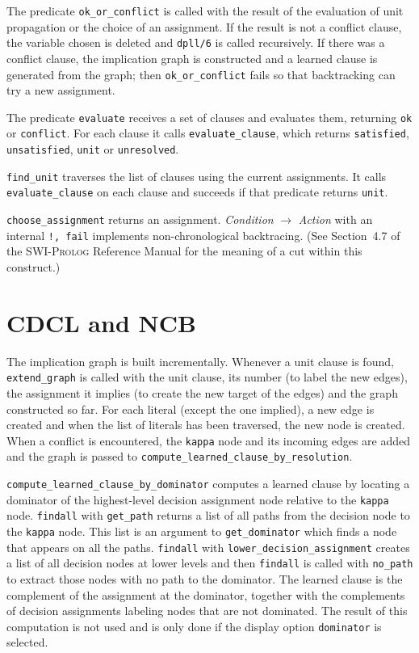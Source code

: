 \documentclass[11pt]{report}
\newcommand*{\p}[1]{\textup{\texttt{#1}}}
\newcommand*{\sw}{\textsc{SWI-Prolog}}
\begin{document}
The predicate \p{ok\_or\_conflict} is called with the result of the
evaluation of unit propagation or the choice of an assignment. If the
result is not a conflict clause, the variable chosen is deleted and
\p{dpll/6} is called recursively. If there was a conflict clause, the
implication graph is constructed and a learned clause is generated from
the graph; then \p{ok\_or\_conflict} fails so that backtracking can try
a new assignment.

The predicate \p{evaluate} receives a set of clauses and evaluates them,
returning \p{ok} or \p{conflict}. For each clause it calls
\p{evaluate\_clause}, which returns \p{satisfied}, \p{unsatisfied},
\p{unit} or \p{unresolved}.

\p{find\_unit} traverses the list of clauses using the current
assignments. It calls \p{evaluate\_clause} on each clause and succeeds
if that predicate returns \p{unit}.

\p{choose\_assignment} returns an assignment. \emph{Condition}
$\rightarrow$ \emph{Action} with an internal \p{!, fail} implements
non-chronological backtracing. (See Section~4.7 of the \sw{} Reference
Manual for the meaning of a cut within this construct.)


\section{CDCL and NCB}

The implication graph is built incrementally. Whenever a unit clause is
found, \p{extend\_graph} is called with the unit clause, its number (to
label the new edges), the assignment it implies (to create the new
target of the edges) and the graph constructed so far. For each literal
(except the one implied), a new edge is created and when the list of
literals has been traversed, the new node is created. When a conflict is
encountered, the \p{kappa} node and its incoming edges are added and the
graph is passed to \p{compute\_learned\_clause\_by\_resolution}.

\p{compute\_learned\_clause\_by\_dominator} computes a learned clause by
locating a dominator of the highest-level decision assignment node
relative to the \p{kappa} node. \p{findall} with \p{get\_path} returns a
list of all paths from the decision node to the \p{kappa} node. This
list is an argument to \p{get\_dominator} which finds a node that
appears on all the paths. \p{findall} with
\p{lower\_decision\_assignment} creates a list of all decision nodes at
lower levels and then \p{findall} is called with \p{no\_path} to extract
those nodes with no path to the dominator. The learned clause is the
complement of the assignment at the dominator, together with the
complements of decision assignments labeling nodes that are not
dominated. The result of this computation is not used and is only
done if the display option \p{dominator} is selected.
\end{document}

